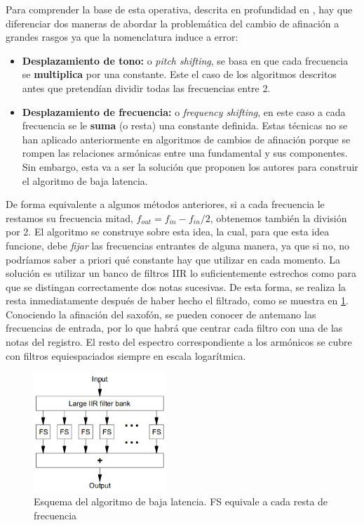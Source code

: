 Para comprender la base de esta operativa, descrita en profundidad en \cite{hilbert}, hay que diferenciar dos maneras de abordar la problemática del cambio de afinación a grandes rasgos ya que la nomenclatura induce a error:
\begin{itemize}
\item \textbf{Desplazamiento de tono: }o \emph{pitch shifting}, se basa en que cada frecuencia se \textbf{multiplica} por una constante. Este el caso de los algoritmos descritos antes que pretendían dividir todas las frecuencias entre 2.
\item \textbf{Desplazamiento de frecuencia: }o \emph{frequency shifting}, en este caso a cada frecuencia se le \textbf{suma} (o resta) una constante definida. Estas técnicas no se han aplicado anteriormente en algoritmos de cambios de afinación porque se rompen las relaciones armónicas entre una fundamental y sus componentes. Sin embargo, esta va a ser la solución que proponen los autores para construir el algoritmo de baja latencia.
\end{itemize}
De forma equivalente a algunos métodos anteriores, si a cada frecuencia le restamos su frecuencia mitad, $f_{out} = f_{in}-f_{in}/2$, obtenemos también la división por 2. El algoritmo se construye sobre esta idea, la cual, para que esta idea funcione, debe \emph{fijar} las frecuencias entrantes de alguna manera, ya que si no, no podríamos saber a priori qué constante hay que utilizar en cada momento. La solución es utilizar un banco de filtros IIR lo suficientemente estrechos como para que se distingan correctamente dos notas sucesivas. De esta forma, se realiza la resta inmediatamente después de haber hecho el filtrado, como se muestra en \ref{fig:fshil}. Conociendo la afinación del saxofón, se pueden conocer de antemano las frecuencias de entrada, por lo que habrá que centrar cada filtro con una de las notas del registro. El resto del espectro correspondiente a los armónicos se cubre con filtros equiespaciados siempre en escala logarítmica.

\begin{figure} [!h]
\begin{center}
\includegraphics[width=5cm]{img/filtros_hilbert.png}
\caption{\label{fig:fshil}Esquema del algoritmo de baja latencia. FS equivale a cada resta de frecuencia}
\end{center}
\end{figure}

